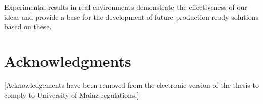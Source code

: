 \documentclass[a4paper,titlepage,oneside,11pt]{book}
\begin{document}
Experimental results in real environments demonstrate the effectiveness of our ideas and provide a base for the development of future production ready solutions based on these.

\chapter*{Acknowledgments}
[Acknowledgements have been removed from the electronic version of the thesis to comply to University of Mainz regulations.]

\listoffigures
\cleardoublepage

\listoftables
\cleardoublepage

\tableofcontents
\mainmatter


\newpage
{}\setcounter{page}{1}






\cleardoublepage
\end{document}
